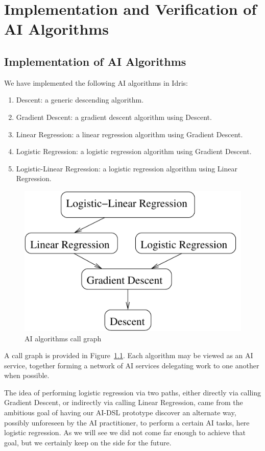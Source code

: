 \documentclass[]{report}
\begin{document}
\chapter{Implementation and Verification of AI Algorithms}

\section{Implementation of AI Algorithms}
We have implemented the following AI algorithms in Idris:
\begin{enumerate}
\item Descent: a generic descending algorithm.
\item Gradient Descent: a gradient descent algorithm using Descent.
\item Linear Regression: a linear regression algorithm using Gradient
  Descent.
\item Logistic Regression: a logistic regression algorithm using
  Gradient Descent.
\item Logistic-Linear Regression: a logistic regression algorithm
  using Linear Regression.
\end{enumerate}
\begin{figure}[H]
  \centering
  \includegraphics[scale=0.8]{figs/ai-algorithms.xfig.pdf}
  \caption{AI algorithms call graph}
  \label{fig:ai_algorithms}
\end{figure}
A call graph is provided in Figure~\ref{fig:ai_algorithms}.  Each
algorithm may be viewed as an AI service, together forming a network
of AI services delegating work to one another when possible.

The idea of performing logistic regression via two paths, either
directly via calling Gradient Descent, or indirectly via calling
Linear Regression, came from the ambitious goal of having our AI-DSL
prototype discover an alternate way, possibly unforeseen by the AI
practitioner, to perform a certain AI tasks, here logistic regression.
As we will see we did not come far enough to achieve that goal, but we
certainly keep on the side for the future.
\end{document}
